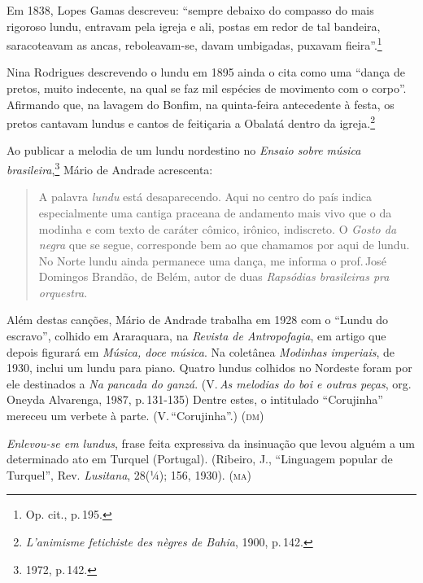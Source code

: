 Em 1838, Lopes Gamas descreveu: ``sempre debaixo do compasso do mais
rigoroso lundu, entravam pela igreja e ali, postas em redor de tal
bandeira, saracoteavam as ancas, reboleavam-se, davam umbigadas, puxavam
fieira''.\footnote{Op. cit., p.\,195.}

Nina Rodrigues descrevendo o lundu em 1895 ainda o cita como uma ``dança
de pretos, muito indecente, na qual se faz mil espécies de movimento com
o corpo''. Afirmando que, na lavagem do Bonfim, na quinta-feira
antecedente à festa, os pretos cantavam lundus e cantos de feitiçaria a
Obalatá dentro da igreja.\footnote{\textit{L'animisme fetichiste des nègres de
Bahia}, 1900, p.\,142.} %

Ao publicar a melodia de um lundu nordestino no \textit{Ensaio sobre
música brasileira},\footnote{1972, p.\,142.} Mário de Andrade acrescenta: 

\begin{quote}
A palavra \textit{lundu} está desaparecendo. Aqui no centro do país indica
especialmente uma cantiga praceana de andamento mais vivo que o da
modinha e com texto de caráter cômico, irônico, indiscreto. O
\textit{Gosto da negra} que se segue, corresponde bem ao que chamamos por
aqui de lundu. No Norte lundu ainda permanece uma dança, me informa o
prof.\,José Domingos Brandão, de Belém, autor de duas \emph{Rapsódias
brasileiras pra orquestra}.
\end{quote}



Além destas canções, Mário de Andrade
trabalha em 1928 com o ``Lundu do escravo'', colhido em
Araraquara, na \emph{Revista de Antropofagia}, em artigo que depois
figurará em \emph{Música, doce música}. Na coletânea \emph{Modinhas
imperiais}, de 1930, inclui um lundu para piano. Quatro lundus colhidos
no Nordeste foram por ele destinados a \emph{Na pancada do ganzá}. (V.\,\emph{As melodias do boi e outras peças}, org. Oneyda Alvarenga, 1987,
p.\,131-135) Dentre estes, o intitulado ``Corujinha'' mereceu um
verbete à parte. (V.\,``Corujinha''.) (\textsc{dm})

\textit{Enlevou-se em lundus}, frase feita expressiva da insinuação que levou
alguém a um determinado ato em Turquel (Portugal). (Ribeiro, J.,
``Linguagem popular de Turquel'', Rev. \emph{Lusitana}, 28(¼); 156, 1930).
(\textsc{ma})

